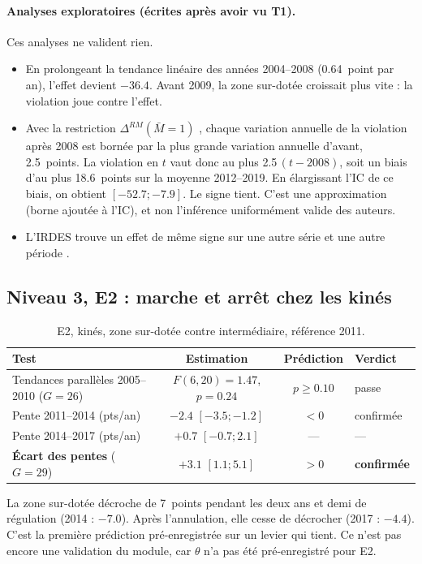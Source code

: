 \documentclass[11pt]{article}
\begin{document}
\paragraph{Analyses exploratoires (écrites après avoir vu T1).} Ces analyses ne valident rien.
\begin{itemize}
  \item En prolongeant la tendance linéaire des années 2004--2008 (\num{+0.64}\mesure{}~point par
        an), l'effet devient $\num{-36.4}$\derive{}. Avant 2009, la zone sur-dotée croissait plus vite :
        la violation joue contre l'effet.
  \item Avec la restriction $\Delta^{RM}(\bar M = 1)$ \citep{rambachan2023}, chaque variation
        annuelle de la violation après 2008 est bornée par la plus grande variation annuelle d'avant,
        \num{2.5}\mesure{}~points. La violation en $t$ vaut donc au plus \num{2.5}\,$(t-2008)$,
        soit un biais d'au plus \num{18.6}\derive{}~points sur la moyenne 2012--2019. En élargissant l'IC de ce biais, on obtient
        $[\num{-52.7} ; \num{-7.9}]$\derive{}. Le signe tient. C'est une approximation (borne
        ajoutée à l'IC), et non l'inférence uniformément valide des auteurs.
  \item L'IRDES trouve un effet de même signe sur une autre série et une autre période
        \citep{irdes270}.
\end{itemize}

\subsection{Niveau 3, E2 : marche et arrêt chez les kinés}
\begin{table}[h]
\centering\small
\begin{tabular}{@{}lccl@{}}
\toprule
Test & Estimation & Prédiction & Verdict \\
\midrule
Tendances parallèles 2005--2010 ($G = 26$) & $F(6, 20) = \num{1.47}$\mesure{}, $p = \num{0.24}$\mesure{} & $p \ge \num{0.10}$ & passe \\
Pente 2011--2014 (pts/an) & $\num{-2.4}$\mesure{} $[\num{-3.5} ; \num{-1.2}]$ & $< 0$ & confirmée \\
Pente 2014--2017 (pts/an) & $+\num{0.7}$\mesure{} $[\num{-0.7} ; \num{2.1}]$ & --- & --- \\
\textbf{Écart des pentes} ($G = 29$) & $\mathbf{+\num{3.1}}$\mesure{} $[\num{1.1} ; \num{5.1}]$ & $> 0$ & \textbf{confirmée} \\
\bottomrule
\end{tabular}
\caption{E2, kinés, zone sur-dotée contre intermédiaire, référence 2011.}\label{tab:e2}
\end{table}
La zone sur-dotée décroche de 7\mesure{}~points pendant les deux ans et demi de régulation (2014 :
$\num{-7.0}$\mesure{}). Après l'annulation, elle cesse de décrocher (2017 : $\num{-4.4}$\mesure{}).
C'est la première prédiction pré-enregistrée sur un levier qui tient. Ce n'est pas encore une
validation du module, car $\theta$ n'a pas été pré-enregistré pour E2.
\end{document}
